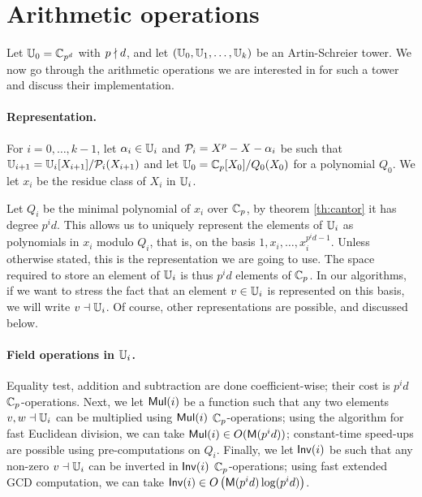 \section{Arithmetic operations}
\label{sec:arithmetics}

Let $\mathbb{U}_0 = \mathbb{C}_{p^d}$ with $p\nmid d$, and let $(\mathbb{U}_0, \mathbb{U}_1, \ldots,
\mathbb{U}_k)$ be an Artin-Schreier tower.  We now go through the arithmetic
operations we are interested in for such a tower and discuss their
implementation. 



\paragraph{Representation.} 
For $i = 0,\ldots,k-1$, let $\alpha_i\in\mathbb{U}_i$ and $\mathcal{P}_i = X^p - X
- \alpha_i$ be such that $\mathbb{U}_{i+1} = \mathbb{U}_i[X_{i+1}]/\mathcal{P}_i(X_{i+1})$
and let $\mathbb{U}_0 = \mathbb{C}_p[X_0]/Q_0(X_0)$ for a polynomial $Q_0$. We let
$x_i$ be the residue class of $X_i$ in $\mathbb{U}_i$.

Let $Q_i$ be the minimal polynomial of $x_i$ over $\mathbb{C}_p$, by theorem
\ref{th:cantor} it has degree $p^id$. This allows us to uniquely
represent the elements of $\mathbb{U}_i$ as polynomials in $x_i$ modulo $Q_i$,
that is, on the basis $1,x_i,\dots,x_i^{p^id-1}$. Unless otherwise
stated, this is the representation we are going to use. The space
required to store an element of $\mathbb{U}_i$ is thus $p^id$ elements of
$\mathbb{C}_p$. In our algorithms, if we want to stress the fact that an
element $v\in\mathbb{U}_i$ is represented on this basis, we will write
$v\dashv\mathbb{U}_i$. Of course, other representations are possible, and
discussed below.


\paragraph{Field operations in $\mathbb{U}_i$.}
Equality test, addition and subtraction are done coefficient-wise;
their cost is $p^id$ $\mathbb{C}_p$-operations. Next, we let $\mathrm{\sf Mul}(i)$ be a
function such that any two elements $v,w\dashv \mathbb{U}_i$ can be multiplied
using $\mathrm{\sf Mul}(i)$ $\mathbb{C}_p$-operations; using the algorithm for fast
Euclidean division, we can take $\mathrm{\sf Mul}(i) \in O(\mathrm{\sf M}(p^id))$;
constant-time speed-ups are possible using pre-computations on $Q_i$.
Finally, we let $\mathrm{\sf Inv}(i)$ be such that any non-zero $v \dashv \mathbb{U}_i$ can
be inverted in $\mathrm{\sf Inv}(i)$ $\mathbb{C}_p$-operations; using fast extended GCD
computation, we can take $\mathrm{\sf Inv}(i) \in
O\left(\mathrm{\sf M}(p^id)\log(p^id)\right)$.

